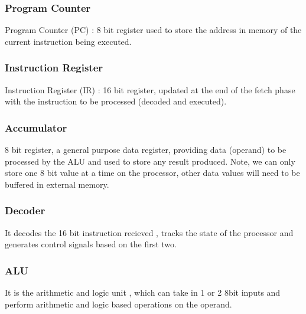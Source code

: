 \documentclass[11pt]{article}
\begin{document}
\subsubsection{Program Counter}
Program Counter (PC) : 8 bit register used to store the address in memory of the current instruction being executed.
\subsubsection{Instruction Register}
Instruction Register (IR) : 16 bit register, updated at the end of the fetch phase with the instruction to be processed (decoded and executed).
\subsubsection{Accumulator }
8 bit register, a general purpose data register, providing data (operand) to be processed by the ALU and used to store any result produced. Note, we can only store one 8 bit value at a time on the processor, other data values will need to be buffered in external memory.
\subsubsection{Decoder}
It decodes the 16 bit instruction recieved , tracks the state of the processor and generates control signals based on the first two.
\subsubsection{ALU}
It is the arithmetic and logic unit , which can take in 1 or 2 8bit inputs and perform arithmetic and logic based operations on the operand. 
\end{document}
